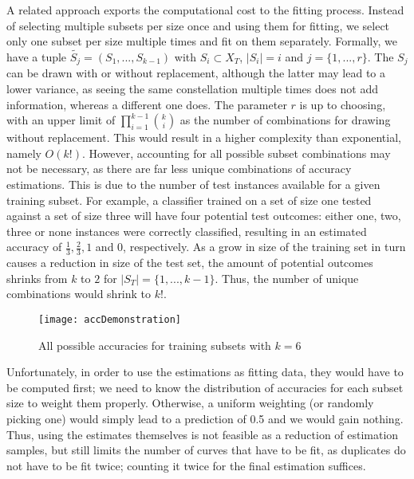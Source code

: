 A related approach exports the computational cost to the fitting process. Instead of selecting multiple subsets per size once and using them for fitting, we select only one subset per size multiple times and fit on them separately. Formally, we have a tuple $\tilde{S_j} = (S_1,...,S_{k-1})$ with $S_i \subset X_T$, $|S_i| = i$ and $j = \{1,...,r\}$. The $S_j$ can be drawn with or without replacement, although the latter may lead to a lower variance, as seeing the same constellation multiple times does not add information, whereas a different one does. The parameter $r$ is up to choosing, with an upper limit of $\prod_{i=1}^{k-1} {k \choose i}$ as the number of combinations for drawing without replacement. This would result in a higher complexity than exponential, namely $O(k!)$. However, accounting for all possible subset combinations may not be necessary, as there are far less unique combinations of accuracy estimations. This is due to the number of test instances available for a given training subset. For example, a classifier trained on a set of size one tested against a set of size three will have four potential test outcomes: either one, two, three or none instances were correctly classified, resulting in an estimated accuracy of $\frac{1}{3}, \frac{2}{3}, 1$ and $0$, respectively. As a grow in size of the training set in turn causes a reduction in size of the test set, the amount of potential outcomes shrinks from $k$ to $2$ for $|S_T| = \{1, ..., k-1\}$. Thus, the number of unique combinations would shrink to $k!$.

\begin{figure}[h]
	\centering
	\texttt{[image: accDemonstration]}
	\caption{All possible accuracies for training subsets with $k = 6$}
	\label{fig:accDemonstration}
\end{figure}

Unfortunately, in order to use the estimations as fitting data, they would have to be computed first; we need to know the distribution of accuracies for each subset size to weight them properly. Otherwise, a uniform weighting (or randomly picking one) would simply lead to a prediction of 0.5 and we would gain nothing. Thus, using the estimates themselves is not feasible as a reduction of estimation samples, but still limits the number of curves that have to be fit, as duplicates do not have to be fit twice; counting it twice for the final estimation suffices.

